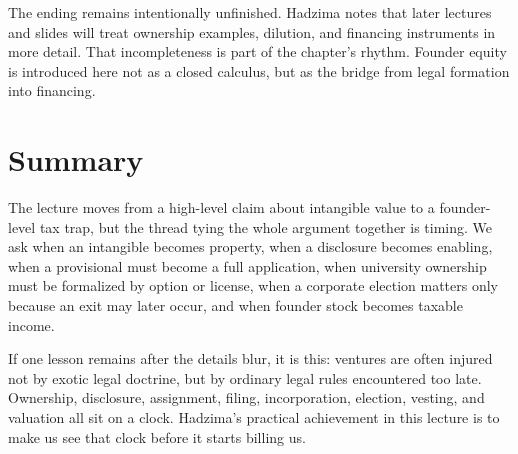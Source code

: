 The ending remains intentionally unfinished. Hadzima notes that later lectures and slides will treat ownership examples, dilution, and financing instruments in more detail. That incompleteness is part of the chapter's rhythm. Founder equity is introduced here not as a closed calculus, but as the bridge from legal formation into financing.

\section{Summary}

The lecture moves from a high-level claim about intangible value to a founder-level tax trap, but the thread tying the whole argument together is timing. We ask when an intangible becomes property, when a disclosure becomes enabling, when a provisional must become a full application, when university ownership must be formalized by option or license, when a corporate election matters only because an exit may later occur, and when founder stock becomes taxable income.

If one lesson remains after the details blur, it is this: ventures are often injured not by exotic legal doctrine, but by ordinary legal rules encountered too late. Ownership, disclosure, assignment, filing, incorporation, election, vesting, and valuation all sit on a clock. Hadzima's practical achievement in this lecture is to make us see that clock before it starts billing us.